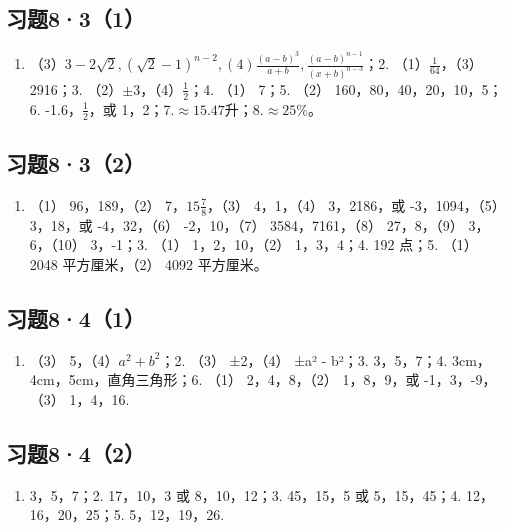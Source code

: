\subsection{习题8·3（1）}

\begin{enumerate}
\item
  （3）\(3 - 2\sqrt{2}, (\sqrt{2} - 1)^{n-2}, (4) \frac{(a - b)^3}{a + b}, \frac{(a - b)^{n-1}}{(x + b)^{n-3}}\)；2.
  （1）\(\frac{1}{64}\)，（3） 2916；3.
  （2）\(\pm 3\)，（4）\(\frac{1}{2}\)；4. （1） 7；5. （2）
  160，80，40，20，10，5；6. -1.6，\(\frac{1}{2}\)，或
  1，2；7.\(\approx 15.47\)升；8.\(\approx 25\%\)。
\end{enumerate}

\subsection{习题8·3（2）}

\begin{enumerate}[start=2]
\item
  （1） 96，189，（2） 7，\(15\frac{7}{8}\)，（3） 4，1，（4）
  3，2186，或 -3，1094，（5） 3，18，或 -4，32，（6） -2，10，（7）
  3584，7161，（8） 27，8，（9） 3，6，（10） 3，-1；3. （1）
  1，2，10，（2） 1，3，4；4. 192 点；5. （1） 2048 平方厘米，（2） 4092
  平方厘米。
\end{enumerate}

\subsection{习题8·4（1）}

\begin{enumerate}
\item
  （3） 5，（4）\(a^2 + b^2\)；2. （3） ±2，（4） ±\textbar a² -
  b²\textbar；3. 3，5，7；4. 3cm，4cm，5cm，直角三角形；6. （1）
  2，4，8，（2） 1，8，9，或 -1，3，-9，（3） 1，4，16.
\end{enumerate}

\subsection{习题8·4（2）}

\begin{enumerate}
\item
  3，5，7；2. 17，10，3 或 8，10，12；3. 45，15，5 或 5，15，45；4.
  12，16，20，25；5. 5，12，19，26.
\end{enumerate}

